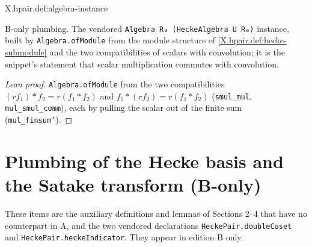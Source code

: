 \begin{definition}
\bonly
{}
\end{definition}
\begin{tfformal}{X.hpair.def:algebra-instance}
\begin{tffidelity}
B-only plumbing. The vendored \texttt{Algebra R₀ (HeckeAlgebra U R₀)} instance, built by \texttt{Algebra.ofModule} from the module structure of \cref{X.hpair.def:hecke-submodule} and the two compatibilities of scalars with convolution; it is the snippet's statement that scalar multiplication commutes with convolution.
\end{tffidelity}
\end{tfformal}
\begin{proof}[Lean proof]
\texttt{Algebra.ofModule} from the two compatibilities $(rf_1)*f_2=r(f_1*f_2)$ and $f_1*(rf_2)=r(f_1*f_2)$ (\texttt{smul\_mul}, \texttt{mul\_smul\_comm}), each by pulling the scalar out of the finite sum (\texttt{mul\_finsum'}).
\end{proof}

\section{Plumbing of the Hecke basis and the Satake transform (B-only)}

\noindent These items are the auxiliary definitions and lemmas of Sections 2--4 that have no counterpart in A, and the two vendored declarations \texttt{HeckePair.doubleCoset} and \texttt{HeckePair.heckeIndicator}. They appear in edition B only.

